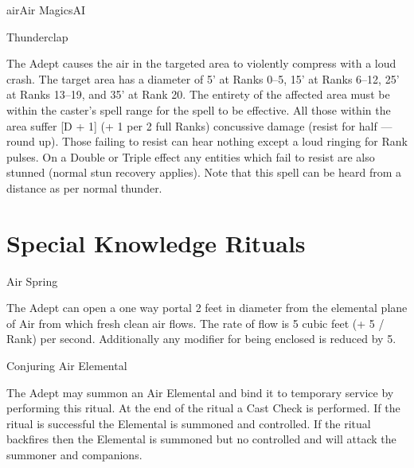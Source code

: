 \begin{College}[2.1]{air}{Air Magics}{AI}
\begin{spell}[S-19]{Thunderclap}
\begin{effects}
The Adept causes the air in the targeted area to violently compress
with a loud crash.  The target area has a diameter of 5’ at Ranks 0–5,
15’ at Ranks 6–12, 25’ at Ranks 13–19, and 35’ at Rank 20.  The
entirety of the affected area must be within the caster’s spell range
for the spell to be effective.  All those within the area suffer [D +
  1] (+ 1 per 2 full Ranks) concussive damage (resist for half — round
up). Those failing to resist can hear nothing except a loud ringing
for Rank pulses. On a Double or Triple effect any entities which fail
to resist are also stunned (normal stun recovery applies).  Note that
this spell can be heard from a distance as per normal thunder.
\end{effects}
\end{spell}


\section{Special Knowledge Rituals}

\begin{ritual}[R-1]{Air Spring}

\begin{effects}
The Adept can open a one way portal 2 feet in diameter from the
elemental plane of Air from which fresh clean air flows. The rate of
flow is 5 cubic feet (+ 5 / Rank) per second.  Additionally any
modifier for being enclosed is reduced by 5.
\end{effects}
\end{ritual}

\begin{ritual}[R-2]{Conjuring Air Elemental}

\begin{effects}
The Adept may summon an Air Elemental and bind it to temporary service
by performing this ritual. At the end of the ritual a Cast Check is
performed.  If the ritual is successful the Elemental is summoned and
controlled.  If the ritual backfires then the Elemental is summoned
but no controlled and will attack the summoner and companions.


\end{effects}
\end{ritual}
\end{College}
